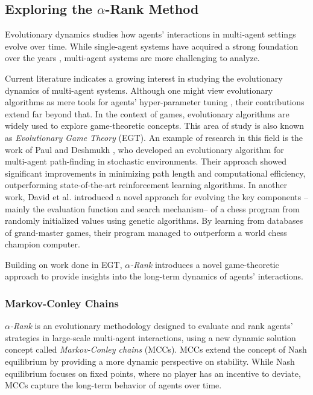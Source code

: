 \subsection{Exploring the \texorpdfstring{$\alpha$}{alpha}-Rank Method}

    Evolutionary dynamics studies how agents' interactions in multi-agent settings evolve over time. While single-agent systems have acquired a strong foundation over the years \cite{10.5555/2831071.2831085}, multi-agent systems are more challenging to analyze.\tinydouble

    \noindent
    Current literature indicates a growing interest in studying the evolutionary dynamics of multi-agent systems. Although one might view evolutionary algorithms as mere tools for agents' hyper-parameter tuning \cite{Sinha_2023}\cite{ganapathy2020studygeneticalgorithmshyperparameter}, their contributions extend far beyond that. In the context of games, evolutionary algorithms are widely used to explore game-theoretic concepts. This area of study is also known as \emph{Evolutionary Game Theory} (EGT). An example of research in this field is the work of Paul and Deshmukh \cite{paul2022multiagentpathfinding}, who developed an evolutionary algorithm for multi-agent path-finding in stochastic environments. Their approach showed significant improvements in minimizing path length and computational efficiency, outperforming state-of-the-art reinforcement learning algorithms. In another work, David et al. \cite{David_2014} introduced a novel approach for evolving the key components --mainly the evaluation function and search mechanism-- of a chess program from randomly initialized values using genetic algorithms. By learning from databases of grand-master games, their program managed to outperform a world chess champion computer.\tinydouble
    
    \noindent
    Building on work done in EGT, \emph{$\alpha$-Rank} \cite{omidshafiei2019alpharank} introduces a novel game-theoretic approach to provide insights into the long-term dynamics of agents' interactions. 

    \subsubsection{Markov-Conley Chains}

        \emph{$\alpha$-Rank} is an evolutionary methodology designed to evaluate and rank agents' strategies in large-scale multi-agent interactions, using a new dynamic solution concept called \emph{Markov-Conley chains} (MCCs). MCCs extend the concept of Nash equilibrium by providing a more dynamic perspective on stability. While Nash equilibrium focuses on fixed points, where no player has an incentive to deviate, MCCs capture the long-term behavior of agents over time.\tinydouble
        
